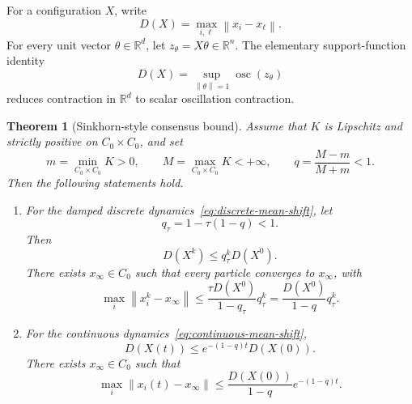 \documentclass[11pt]{article}
\newtheorem{theorem}{Theorem}[section]
\theoremstyle{definition}
\newcommand{\R}{\mathbb{R}}
\newcommand{\osc}{\operatorname{osc}}
\newcommand{\norm}[1]{\left\lVert #1\right\rVert}
\begin{document}
For a configuration $X$, write
\begin{equation}\label{eq:cloud-diameter}
  D(X)=\max_{i,\ell}\norm{x_i-x_\ell}.
\end{equation}
For every unit vector $\theta\in\R^d$, let
$z_\theta=X\theta\in\R^n$.  The elementary support-function identity
\begin{equation}\label{eq:diameter-directional}
  D(X)
  =
  \sup_{\norm{\theta}=1}\osc(z_\theta)
\end{equation}
reduces contraction in $\R^d$ to scalar oscillation contraction.

\begin{theorem}[Sinkhorn-style consensus bound]\label{thm:mean-shift-consensus}
Assume that $K$ is Lipschitz and strictly positive on $C_0\times C_0$, and
set
\begin{equation}\label{eq:kernel-bounds}
  m=\min_{C_0\times C_0}K>0,
  \qquad
  M=\max_{C_0\times C_0}K<+\infty,
  \qquad
  q=\frac{M-m}{M+m}<1.
\end{equation}
Then the following statements hold.

\begin{enumerate}
\item For the damped discrete dynamics~\eqref{eq:discrete-mean-shift}, let
\begin{equation}\label{eq:damped-factor}
  q_\tau=1-\tau(1-q)<1.
\end{equation}
Then
\begin{equation}\label{eq:discrete-diameter-rate}
  D(X^k)\leq q_\tau^kD(X^0).
\end{equation}
There exists $x_\infty\in C_0$ such that every particle converges to
$x_\infty$, with
\begin{equation}\label{eq:discrete-point-rate}
  \max_i\norm{x_i^k-x_\infty}
  \leq
  \frac{\tau D(X^0)}{1-q_\tau}q_\tau^k
  =
  \frac{D(X^0)}{1-q}q_\tau^k.
\end{equation}

\item For the continuous dynamics~\eqref{eq:continuous-mean-shift},
\begin{equation}\label{eq:continuous-diameter-rate}
  D(X(t))
  \leq
  e^{-(1-q)t}D(X(0)).
\end{equation}
There exists $x_\infty\in C_0$ such that
\begin{equation}\label{eq:continuous-point-rate}
  \max_i\norm{x_i(t)-x_\infty}
  \leq
  \frac{D(X(0))}{1-q}e^{-(1-q)t}.
\end{equation}
\end{enumerate}
\end{theorem}
\end{document}
